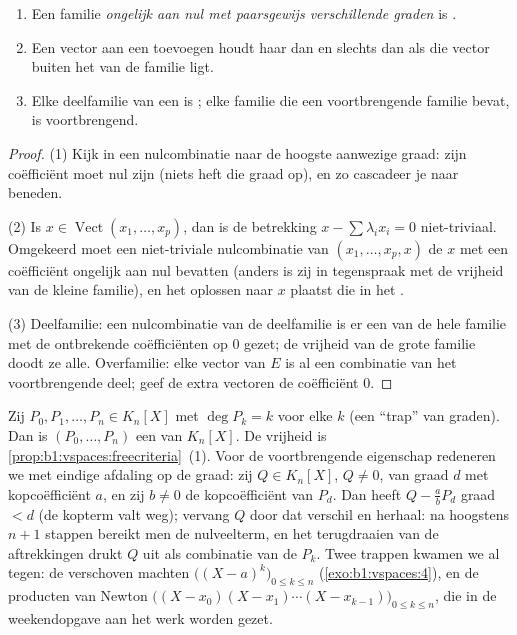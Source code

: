 \begin{proposition}\label{prop:b1:vspaces:freecriteria}
\begin{enumerate}
  \item Een familie \emph{ ongelijk aan nul met
        paarsgewijs verschillende graden} is .
  \item Een vector aan een  toevoegen houdt haar 
        dan en slechts dan als die vector buiten het  van
        de familie ligt.
  \item Elke deelfamilie van een  is ; elke
        familie die een voortbrengende familie bevat, is
        voortbrengend.
\end{enumerate}
\end{proposition}

\begin{proof}
(1) Kijk in een nulcombinatie naar de hoogste aanwezige graad: zijn
coëfficiënt moet nul zijn (niets heft die graad op), en zo cascadeer
je naar beneden.

(2) Is $x \in \operatorname{Vect}(x_1, \dots, x_p)$, dan is de
betrekking $x - \sum\lambda_i x_i = 0$ niet-triviaal. Omgekeerd moet
een niet-triviale nulcombinatie van $(x_1, \dots, x_p, x)$ de $x$
met een coëfficiënt ongelijk aan nul bevatten (anders is zij in
tegenspraak met de vrijheid van de kleine familie), en het oplossen
naar $x$ plaatst die in het .

(3) Deelfamilie: een nulcombinatie van de deelfamilie is er een van
de hele familie met de ontbrekende coëfficiënten op $0$ gezet; de
vrijheid van de grote familie doodt ze alle. Overfamilie: elke
vector van $E$ is al een combinatie van het voortbrengende deel;
geef de extra vectoren de coëfficiënt $0$.
\end{proof}

\begin{example}
\label{ex:b1:vspaces:staircase}
Zij $P_0, P_1, \dots, P_n \in K_n[X]$ met $\deg P_k = k$ voor elke
$k$ (een ``trap'' van graden). Dan is $(P_0, \dots, P_n)$ een 
van $K_n[X]$. De vrijheid is
\cref{prop:b1:vspaces:freecriteria}~(1). Voor de voortbrengende
eigenschap redeneren we met eindige afdaling op de graad: zij $Q
\in K_n[X]$, $Q \neq 0$, van graad $d$ met kopcoëfficiënt $a$, en
zij $b \neq 0$ de kopcoëfficiënt van $P_d$. Dan heeft $Q - \frac ab
P_d$ graad $< d$ (de kopterm valt weg); vervang $Q$ door dat
verschil en herhaal: na hoogstens $n + 1$ stappen bereikt men de
nulveelterm, en het terugdraaien van de aftrekkingen drukt $Q$ uit
als combinatie van de $P_k$. Twee trappen kwamen we al tegen: de
verschoven machten $\bigl((X-a)^k\bigr)_{0 \leq k \leq n}$
(\cref{exo:b1:vspaces:4}), en de producten van Newton $\bigl((X -
x_0)(X - x_1)\cdots(X - x_{k-1})\bigr)_{0 \leq k \leq n}$, die in
de weekendopgave aan het werk worden gezet.
\end{example}

